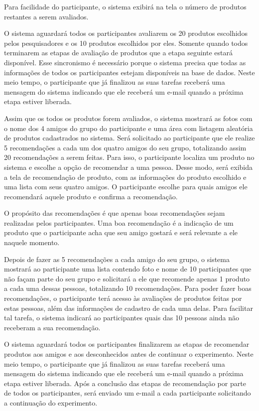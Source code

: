  Para facilidade do participante, o sistema exibirá na tela o número de produtos restantes a serem avaliados.

 O sistema aguardará todos os participantes avaliarem os 20 produtos escolhidos pelos pesquisadores e os 10 produtos escolhidos por eles. Somente quando todos terminarem as etapas de avaliação de produtos que a etapa seguinte estará disponível. Esse sincronismo é necessário porque o sistema precisa que todas as informações de todos os participantes estejam disponíveis na base de dados. Neste meio tempo, o participante que já finalizou as suas tarefas receberá uma mensagem do sistema indicando que ele receberá um e-mail quando a próxima etapa estiver liberada.
 
 Assim que os todos os produtos forem avaliados, o sistema mostrará as fotos com o nome dos 4 amigos do grupo do participante e uma área com listagem aleatória de produtos cadastrados no sistema. Será solicitado ao participante que ele realize 5 recomendações a cada um dos quatro amigos do seu grupo, totalizando assim 20 recomendações a serem feitas. Para isso, o participante localiza um produto no sistema e escolhe a opção de recomendar a uma pessoa. Desse modo, será exibida a tela de recomendação de produto, com as informações do produto escolhido e uma lista com seus quatro amigos. O participante escolhe para quais amigos ele recomendará aquele produto e confirma a recomendação.
 
 O propósito das recomendações é que apenas boas recomendações sejam realizadas pelos participantes. Uma boa recomendação é a indicação de um produto que o participante acha que seu amigo gostará e será relevante a ele naquele momento.

 Depois de fazer as 5 recomendações a cada amigo do seu grupo, o sistema mostrará ao participante uma lista contendo foto e nome de 10 participantes que não façam parte do seu grupo e solicitará a ele que recomende apenas 1 produto a cada uma dessas pessoas, totalizando 10 recomendações. Para poder fazer boas recomendações, o participante terá acesso às avaliações de produtos feitas por estas pessoas, além das informações de cadastro de cada uma delas. Para facilitar tal tarefa, o sistema indicará ao participantes quais das 10 pessoas ainda não receberam a sua recomendação.

 O sistema aguardará todos os participantes finalizarem as etapas de recomendar produtos aos amigos e aos desconhecidos antes de continuar o experimento. Neste meio tempo, o participante que já finalizou as suas tarefas receberá uma mensagem do sistema indicando que ele receberá um e-mail quando a próxima etapa estiver liberada. Após a conclusão das etapas de recomendação por parte de todos os participantes, será enviado um e-mail a cada participante solicitando a continuação do experimento.
 
